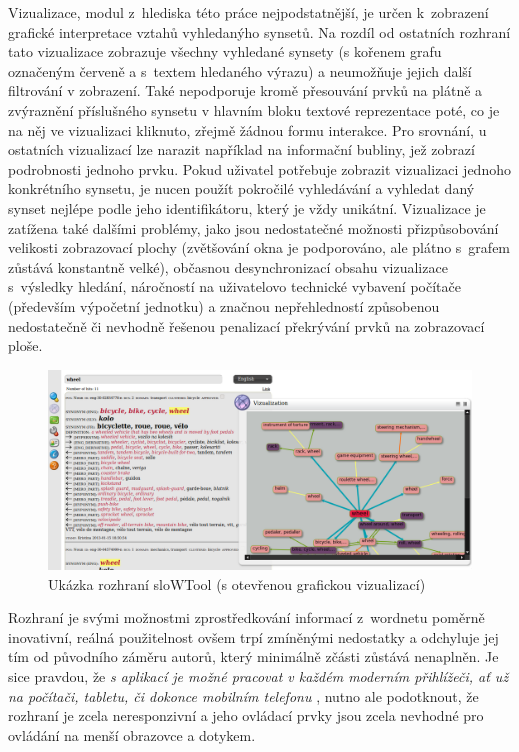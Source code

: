 \documentclass[a4paper, 11pt, oneside, showtrims]{book}
\begin{document}
					Vizualizace, modul z~hlediska této práce nejpodstatnější, je určen k~zobrazení grafické interpretace vztahů vyhledanýho synsetů. Na rozdíl od ostatních rozhraní tato vizualizace zobrazuje všechny vyhledané synsety (s kořenem grafu označeným červeně a s~textem hledaného výrazu) a neumožňuje jejich další filtrování v zobrazení. Také nepodporuje kromě přesouvání prvků na plátně a zvýraznění příslušného synsetu v hlavním bloku textové reprezentace poté, co je na něj ve vizualizaci kliknuto, zřejmě žádnou formu interakce. Pro srovnání, u ostatních vizualizací lze narazit například na informační bubliny, jež zobrazí podrobnosti jednoho prvku. Pokud uživatel potřebuje zobrazit vizualizaci jednoho konkrétního synsetu, je nucen použít pokročilé vyhledávání a vyhledat daný synset nejlépe podle jeho identifikátoru, který je vždy unikátní. Vizualizace je zatížena také dalšími problémy, jako jsou nedostatečné možnosti přizpůsobování velikosti zobrazovací plochy (zvětšování okna je podporováno, ale plátno s~grafem zůstává konstantně velké), občasnou desynchronizací obsahu vizualizace s~výsledky hledání, náročností na uživatelovo technické vybavení počítače (především výpočetní jednotku) a značnou nepřehledností způsobenou nedostatečně či nevhodně řešenou penalizací překrývání prvků na zobrazovací ploše. 

					\begin{figure}[h]
						\centering
						\includegraphics[width=1.0\textwidth]{slowtool.png}
						\caption{Ukázka rozhraní sloWTool (s otevřenou grafickou vizualizací)}
						\label{fig:slowtool}
					\end{figure}

					Rozhraní je svými možnostmi zprostředkování informací z~wordnetu poměrně inovativní, reálná použitelnost ovšem trpí zmíněnými nedostatky a odchyluje jej tím od původního záměru autorů, který minimálně zčásti zůstává nenaplněn. Je sice pravdou, že \textit{s aplikací je možné pracovat v každém moderním přihlížeči, ať už na počítači, tabletu, či dokonce mobilním telefonu} \parencite{fivser2011visualizing}, nutno ale podotknout, že rozhraní je zcela neresponzivní a jeho ovládací prvky jsou zcela nevhodné pro ovládání na menší obrazovce a dotykem.
\end{document}
